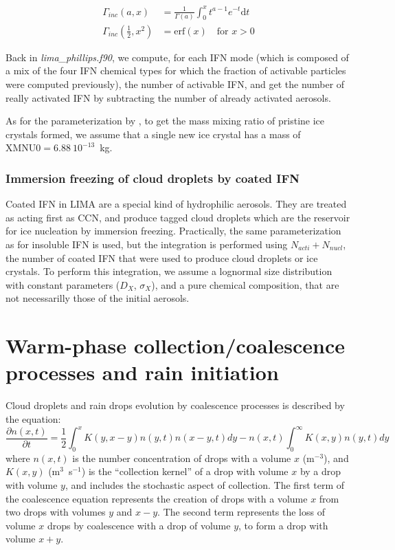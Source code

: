 {
\begin{align*}
 \Gamma_{inc}(a,x) &= \frac{1}{\Gamma(a)} \int_0^x t^{a-1} e^{-t} \mathrm{d}t\\
 \Gamma_{inc}(\frac{1}{2},x^2) &= \mathrm{erf}(x) \quad \textrm{for $x > 0$}
\end{align*}

Back in \emph{lima\_phillips.f90}, we compute, for each IFN mode (which is composed of a mix of the four IFN chemical types for which the fraction of activable particles were computed previously), the number of activable IFN, and get the number of really activated IFN by subtracting the number of already activated aerosols.

As for the parameterization by \citet{Meyers1992}, to get the mass mixing ratio of pristine ice crystals formed, we assume that a single new ice crystal has a mass of $\mathrm{XMNU0} = 6.88~10^{-13}$~kg.

\subsubsection{Immersion freezing of cloud droplets by coated IFN}

Coated IFN in LIMA are a special kind of hydrophilic aerosols. They are treated as acting first as CCN, and produce tagged cloud droplets which are the reservoir for ice nucleation by immersion freezing. Practically, the same parameterization as for insoluble IFN is used, but the integration is performed using $N_{acti}+N_{nucl}$, the number of coated IFN that were used to produce cloud droplets or ice crystals.
To perform this integration, we assume a lognormal size distribution with constant parameters ($D_X$, $\sigma_X$), and a pure chemical composition, that are not necessarilly those of the initial aerosols.




\section{Warm-phase collection/coalescence processes and rain initiation}

Cloud droplets and rain drops evolution by coalescence processes is described by the equation:
\begin{equation}
 \frac{\partial n(x,t)}{\partial t} = \frac{1}{2} \int_0^x K(y,x-y)n(y,t)n(x-y,t)dy - n(x,t) \int_0^\infty K(x,y)n(y,t)dy
\end{equation}
where $n(x,t)$ is the number concentration of drops with a volume $x$ (m$^{-3}$), and $K(x,y)$ (m$^3$~s$^{-1}$) is the ``collection kernel'' of a drop with volume $x$ by a drop with volume $y$, and includes the stochastic aspect of collection. The first term of the coalescence equation represents the creation of drops with a volume $x$ from two drops with volumes $y$ and $x-y$. The second term represents the loss of volume $x$ drops by coalescence with a drop of volume $y$, to form a drop with volume $x+y$.

}
